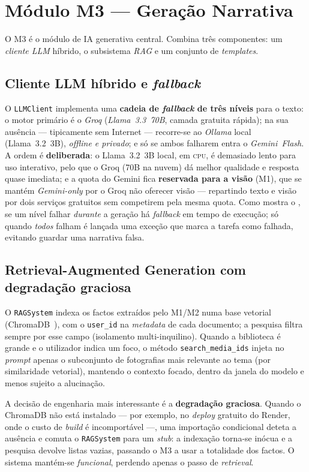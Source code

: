 \section{Módulo M3 --- Geração Narrativa}
\label{sec:impl_m3}

O M3 é o módulo de IA generativa central. Combina três componentes: um
\emph{cliente LLM} híbrido, o subsistema \emph{RAG} e um conjunto de
\emph{templates}.

\subsection{Cliente LLM híbrido e \emph{fallback}}

O \texttt{LLMClient} implementa uma \textbf{cadeia de \emph{fallback} de
três níveis} para o texto: o motor primário é o \emph{Groq}
(\emph{Llama~3.3~70B}, camada gratuita rápida); na sua ausência ---
tipicamente sem Internet --- recorre-se ao \emph{Ollama} local
(Llama~3.2~3B), \emph{offline e privado}; e só se ambos falharem entra o
\emph{Gemini~Flash}. A ordem é \textbf{deliberada}: o Llama~3.2~3B local, em
\textsc{cpu}, é demasiado lento para uso interativo, pelo que o Groq (70B na
nuvem) dá melhor qualidade e resposta quase imediata; e a quota do Gemini
fica \textbf{reservada para a visão} (M1), que se mantém \emph{Gemini-only}
por o Groq não oferecer visão --- repartindo texto e visão por dois
serviços gratuitos sem competirem pela mesma quota. Como mostra o
, se um nível falhar \emph{durante} a geração há
\emph{fallback} em tempo de execução; só quando \emph{todos} falham é
lançada uma exceção que marca a tarefa como falhada, evitando guardar uma
narrativa falsa.

\subsection{Retrieval-Augmented Generation com degradação graciosa}

O \texttt{RAGSystem} indexa os factos extraídos pelo M1/M2 numa base
vetorial (ChromaDB~\cite{chromadb}), com o \texttt{user\_id} na
\emph{metadata} de cada documento; a pesquisa filtra sempre por esse campo
(isolamento multi-inquilino). Quando a biblioteca é grande e o utilizador
indica um foco, o método \texttt{search\_media\_ids} injeta no \emph{prompt}
apenas o subconjunto de fotografias mais relevante ao tema (por
similaridade vetorial), mantendo o contexto focado, dentro da janela do
modelo e menos sujeito a alucinação.

A decisão de engenharia mais interessante é a \textbf{degradação graciosa}.
Quando o ChromaDB não está instalado --- por exemplo, no \emph{deploy}
gratuito do Render, onde o custo de \emph{build} é incomportável ---, uma
importação condicional deteta a ausência e comuta o \texttt{RAGSystem} para
um \emph{stub}: a indexação torna-se inócua e a pesquisa devolve listas
vazias, passando o M3 a usar a totalidade dos factos. O sistema mantém-se
\emph{funcional}, perdendo apenas o passo de \emph{retrieval}.

